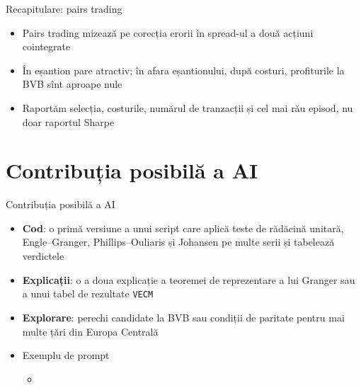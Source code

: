 \begin{frame}{Recapitulare: pairs trading}
\itemsize{\small}
\begin{itemize}
    \item Pairs trading mizează pe corecția erorii în spread-ul a două acțiuni cointegrate
    \item În eșantion pare atractiv; în afara eșantionului, după costuri, profiturile la BVB sînt aproape nule
    \item Raportăm selecția, costurile, numărul de tranzacții și cel mai rău episod, nu doar raportul Sharpe
\end{itemize}
\end{frame}


\section{Contribuția posibilă a AI}

\begin{frame}{Contribuția posibilă a AI}
\itemsize{\small}
\begin{itemize}
    \item \textbf{Cod}: o primă versiune a unui script care aplică teste de rădăcină unitară, Engle--Granger, Phillips--Ouliaris și Johansen pe multe serii și tabelează verdictele
    \item \textbf{Explicații}: o a doua explicație a teoremei de reprezentare a lui Granger sau a unui tabel de rezultate \texttt{VECM}
    \item \textbf{Explorare}: perechi candidate la BVB sau condiții de paritate pentru mai multe țări din Europa Centrală
    \item Exemplu de prompt
    \begin{itemize}
        \item {}
    \end{itemize}
\end{itemize}
\end{frame}

